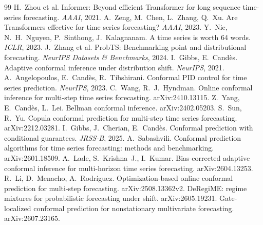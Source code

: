 \documentclass[11pt]{article}
\begin{document}
\small
\begin{thebibliography}{99}
 H.~Zhou et al. Informer: Beyond efficient Transformer for long sequence time-series forecasting. \emph{AAAI}, 2021.
 A.~Zeng, M.~Chen, L.~Zhang, Q.~Xu. Are Transformers effective for time series forecasting? \emph{AAAI}, 2023.
 Y.~Nie, N.~H.~Nguyen, P.~Sinthong, J.~Kalagnanam. A time series is worth 64 words. \emph{ICLR}, 2023.
 J.~Zhang et al. ProbTS: Benchmarking point and distributional forecasting. \emph{NeurIPS Datasets \& Benchmarks}, 2024.
 I.~Gibbs, E.~Cand\`es. Adaptive conformal inference under distribution shift. \emph{NeurIPS}, 2021.
 A.~Angelopoulos, E.~Cand\`es, R.~Tibshirani. Conformal PID control for time series prediction. \emph{NeurIPS}, 2023.
 C.~Wang, R.~J.~Hyndman. Online conformal inference for multi-step time series forecasting. arXiv:2410.13115.
 Z.~Yang, E.~Cand\`es, L.~Lei. Bellman conformal inference. arXiv:2402.05203.
 S.~Sun, R.~Yu. Copula conformal prediction for multi-step time series forecasting. arXiv:2212.03281.
 I.~Gibbs, J.~Cherian, E.~Cand\`es. Conformal prediction with conditional guarantees. \emph{JRSS-B}, 2025.
 A.~Sabashvili. Conformal prediction algorithms for time series forecasting: methods and benchmarking. arXiv:2601.18509.
 A.~Lade, S.~Krishna~J., I.~Kumar. Bias-corrected adaptive conformal inference for multi-horizon time series forecasting. arXiv:2604.13253.
 R.~Li, D.~Menacho, A.~Rodr\'iguez. Optimization-based online conformal prediction for multi-step forecasting. arXiv:2508.13362v2.
 DeRegiME: regime mixtures for probabilistic forecasting under shift. arXiv:2605.19231.
 Gate-localized conformal prediction for nonstationary multivariate forecasting. arXiv:2607.23165.
\end{thebibliography}
\end{document}
